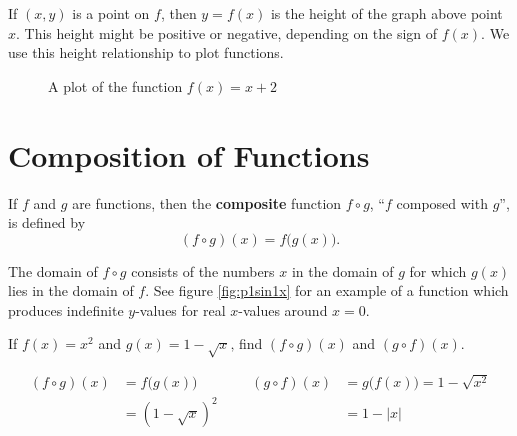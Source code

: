 If \( (x,y) \) is a point on \(f\), then \(y=f(x)\) is the height of the graph above point \(x\).
This height might be positive or negative, depending on the sign of \(f(x)\).
We use this height relationship to plot functions.
\begin{figure}[H]
    \begin{center}
      \caption{A plot of the function \(f(x)=x+2\)}
    \end{center}
  \end{figure}

\section{Composition of Functions}
\label{sec:compositefunctions}
\begin{defn}
  If \(f\) and \(g\) are functions, then the \textbf{composite} function \(f \circ g\), ``\(f\) composed with \(g\)'', is defined by
  \[ (f \circ g)(x)=f\bigl(g(x)\bigr) \text{.} \]
  \begin{remark}
    The domain of \( f \circ g \) consists of the numbers \(x\) in the domain of \(g\) for which \(g(x)\) lies in the domain of \(f\).
    See figure \ref{fig:p1sin1x} for an example of a function which produces indefinite $y$-values for real $x$-values around $x=0$.
  \end{remark}
\end{defn}
\begin{ex}
  If
  \(f(x)=x^2\)
  and
  \(g(x)=1-\sqrt{x}\text{,}\)
  find \( (f \circ g)(x) \) and \( (g \circ f)(x)\).
  \begin{sol}
    \begin{align*}
      (f \circ g)(x)
      &=f\big(g(x)\big)
      &&&
      (g \circ f)(x)
      &=g\big(f(x)\big)=1-\sqrt{x^2}
      \\
      &=(1-\sqrt{x})^2
      &&&
      &= 1-|x|
    \end{align*}
  \end{sol}
\end{ex}

